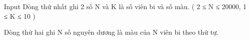 Input
Dòng thứ nhất ghi 2 số N và K là số viên bi và số màu. ( 2 ≤ N ≤ 20000, 1 ≤ K ≤ 10 )  

   Dòng thứ hai ghi N số nguyên dương là màu của N viên bi theo thứ tự.